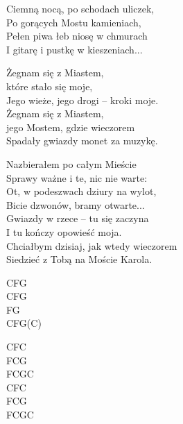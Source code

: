 \begin{text}
Ciemną nocą, po schodach uliczek,\\
Po gorących Mostu kamieniach,\\
Pełen piwa łeb niosę w chmurach\\
I gitarę i pustkę w kieszeniach...

\vin Żegnam się  z Miastem,\\
\vin które  stało się moje,\\
\vin Jego wieże, jego drogi – kroki moje.	\\
\vin Żegnam się  z Miastem,\\
\vin jego Mostem, gdzie wieczorem\\
\vin Spadały gwiazdy monet za muzykę.

Nazbierałem po całym Mieście\\
Sprawy ważne i te, nic nie warte:\\
Ot, w podeszwach dziury na wylot,\\
Bicie dzwonów, bramy otwarte...\\

Gwiazdy w rzece – tu się zaczyna\\
I tu kończy opowieść moja.\\
Chciałbym dzisiaj, jak wtedy wieczorem\\
Siedzieć z Tobą na Moście Karola.
\end{text}
\begin{chord}
CFG\\
CFG\\
FG\\
CFG(C)

CFC\\
FCG\\
FCGC\\
CFC\\
FCG\\
FCGC
\end{chord}